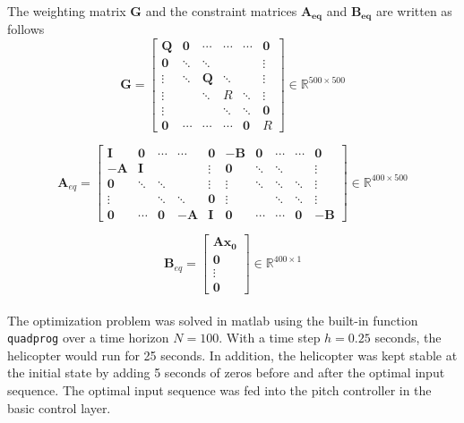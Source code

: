 \documentclass[11pt,a4paper,USenglish]{article} %
\begin{document}
The weighting matrix $\mathbf{G}$ and the constraint matrices $\mathbf{A_{eq}}$ and $\mathbf{B_{eq}}$ are written as follows
\begin{equation}
\mathbf{G} = \begin{bmatrix}
\mathbf{Q} 	& \mathbf{0}& \cdots & \cdots & \cdots & \mathbf{0}\\
\mathbf{0} 	& \ddots 	& \ddots 	& 		  & 	   & \vdots \\
\vdots 		& \ddots 	& \mathbf{Q} & \ddots & 	& \vdots\\
\vdots 		&  			& \ddots 	& R 	& \ddots & \vdots\\
\vdots 		& 			& & \ddots 	& \ddots & \mathbf{0}\\
\mathbf{0} 	& \cdots 	& \cdots 	& \cdots & \mathbf{0} & R
\end{bmatrix} \in  \mathbb{R}^{500 \times 500}
\end{equation}

\begin{equation}
\label{eq:Aeq}
\mathbf{A}_{eq} = \begin{bmatrix}
\mathbf{I} & \mathbf{0} & \cdots & \cdots & \mathbf{0} & - \mathbf{B} & \mathbf{0} & \cdots & \cdots & \mathbf{0}\\
-\mathbf{A} & \mathbf{I} & & & \vdots & \mathbf{0} & \ddots & \ddots & & \vdots\\
\mathbf{0} & \ddots & \ddots & & \vdots & \vdots & \ddots & \ddots & \ddots & \vdots\\
\vdots & & \ddots & \ddots & \mathbf{0} & \vdots & & \ddots & \ddots & \vdots \\
\mathbf{0} & \cdots & \mathbf{0} & -\mathbf{A}  & \mathbf{I} & \mathbf{0} & \cdots & \cdots & \mathbf{0} & -\mathbf{B}
\end{bmatrix} \in  \mathbb{R}^{400 \times 500}
\end{equation}

\begin{equation}
\label{eq:Beq}
\mathbf{B}_{eq} = \begin{bmatrix}\mathbf{A x_0} \\ \mathbf{0}\\ \vdots \\ \mathbf{0} \end{bmatrix} \in \mathbb{R}^{400 \times 1}
\end{equation}\\

The optimization problem was solved in matlab using the built-in function \verb!quadprog! over a time horizon $N = 100$. With a time step $h = 0.25$ seconds, the helicopter would run for 25 seconds. In addition, the helicopter was kept stable at the initial state by adding 5 seconds of zeros before and after the optimal input sequence. The optimal input sequence was fed into the pitch controller in the basic control layer.\\
\end{document}
